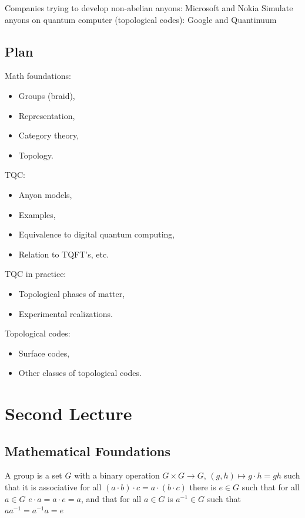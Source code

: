\documentclass[a4paper,oneside,11pt]{article}
\begin{document}
Companies trying to develop non-abelian anyons: Microsoft and Nokia
Simulate anyons on quantum computer (topological codes): Google and Quantinuum

\subsection{Plan}
Math foundations:
\begin{itemize}
    \item Groups (braid),
    \item Representation,
    \item Category theory,
    \item Topology.
\end{itemize}

TQC:
\begin{itemize}
    \item Anyon models,
    \item Examples,
    \item Equivalence to digital quantum computing,
    \item Relation to TQFT's, etc.
\end{itemize}

TQC in practice:
\begin{itemize}
    \item Topological phases of matter,
    \item Experimental realizations.
\end{itemize}

Topological codes:
\begin{itemize}
    \item Surface codes,
    \item Other classes of topological codes.
\end{itemize}

\newpage\section{Second Lecture}
\subsection{Mathematical Foundations}
A group is a set $G$ with a binary operation $G\times G\to G$, $(g,h)\mapsto g\cdot h = gh$ such that it is associative for all $(a\cdot b)\cdot c=a\cdot(b\cdot c)$ there is $e\in G$ such that for all $a\in G$ $e\cdot a=a\cdot e= a$, and that for all $a\in G$ is $a^{-1}\in G$ such that $aa^{-1}=a^{-1}a=e$
\end{document}
